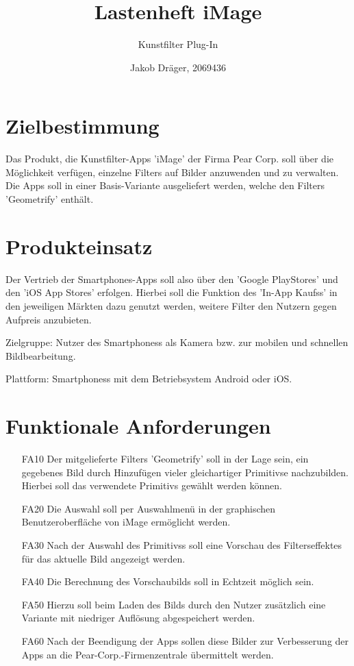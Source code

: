 \documentclass[parskip=full]{scrartcl}
\title{Lastenheft iMage}
\subtitle{Kunstfilter Plug-In}
\author{Jakob Dr\"ager, 2069436}
\begin{document}
\maketitle

\section{Zielbestimmung}
Das Produkt, die Kunstfilter-\glspl{App} 'iMage' der Firma Pear Corp. soll \"uber die M\"oglichkeit verf\"ugen, einzelne \glspl{Filter} auf Bilder anzuwenden und zu verwalten. Die \glspl{App} soll in einer Basis-Variante ausgeliefert werden, welche den \glspl{Filter} 'Geometrify' enth\"alt.

\section{Produkteinsatz}
 Der Vertrieb der \glspl{Smartphone}-\glspl{App} soll also \"uber den '\glspl{Google PlayStore}' und den '\glspl{iOS App Store}' erfolgen. Hierbei soll die Funktion des '\glspl{In-App Kauf}s' in den jeweiligen M\"arkten dazu genutzt werden, weitere Filter den Nutzern gegen Aufpreis anzubieten.
 
Zielgruppe: Nutzer des \glspl{Smartphone}s als Kamera bzw. zur mobilen und schnellen Bildbearbeitung.

Plattform: \glspl{Smartphone}s mit dem Betriebsystem Android oder iOS.

\section{Funktionale Anforderungen}
\begin{itemize}[nosep]
\item[FA10] Der mitgelieferte \glspl{Filter} 'Geometrify' soll in der Lage sein, ein gegebenes Bild durch Hinzuf\"ugen vieler gleichartiger \glspl{Primitiv}e nachzubilden. Hierbei soll das verwendete \glspl{Primitiv} gew\"ahlt werden k\"onnen.
\item[FA20] Die Auswahl soll per Auswahlmen\"u in der graphischen Benutzeroberfl\"ache von iMage erm\"oglicht werden.
\item[FA30] Nach der Auswahl des \glspl{Primitiv}s soll eine Vorschau des \glspl{Filter}effektes f\"ur das aktuelle Bild angezeigt werden.
\item[FA40] Die Berechnung des Vorschaubilds soll in Echtzeit m\"oglich sein.
\item[FA50] Hierzu soll beim Laden des Bilds durch den Nutzer zus\"atzlich eine Variante mit niedriger Aufl\"osung abgespeichert werden.
\item[FA60] Nach der Beendigung der \glspl{App} sollen diese Bilder zur Verbesserung der \glspl{App} an die Pear-Corp.-Firmenzentrale \"ubermittelt werden.
\end{itemize}
\end{document}
